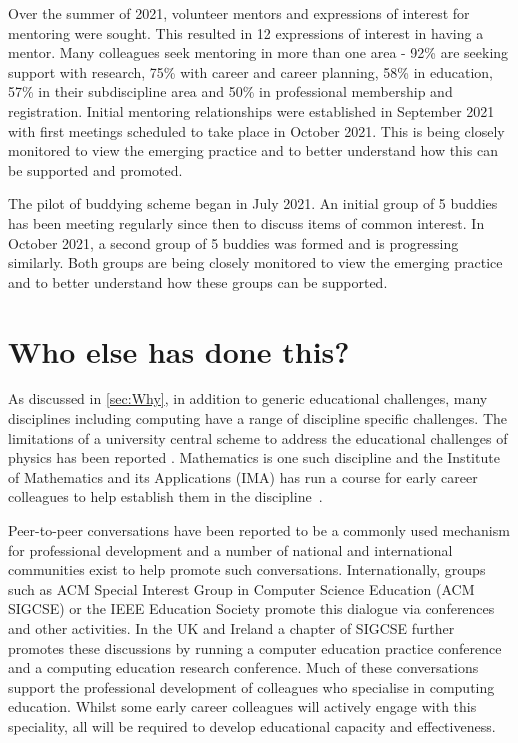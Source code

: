 \documentclass[sigconf]{acmart}
\begin{document}
Over the summer of 2021, volunteer mentors and expressions of interest for mentoring were sought. This resulted in 12 expressions of interest in having a mentor. Many colleagues seek mentoring in more than one area - 92\% are seeking support with research, 75\% with career and career planning, 58\% in education, 57\% in their subdiscipline area and 50\% in professional membership and registration. Initial mentoring relationships were established in September 2021 with first meetings scheduled to take place in October 2021. This is being closely monitored to view the emerging practice and to better understand how this can be supported and promoted.

\begin{comment}
To DO - evaluation of Buddying - PH what is needed here? Is sufficient to indicate the first pilot of 10 buddies has been established? Or do we need feedback from the participants?
\end{comment}

The pilot of buddying scheme began in July 2021. An initial group of 5
buddies has been meeting regularly since then to discuss items of
common interest. In October 2021, a second group of 5 buddies was
formed and is progressing similarly. Both groups are being closely
monitored to view the emerging practice and to better understand how
these groups can be supported.


\section{Who else has done this?}
As discussed in \ref{sec:Why}, in addition to generic educational
challenges, many disciplines including computing have a range of
discipline specific challenges. The limitations of a university
central scheme to address the educational challenges of physics has
been reported \cite{Magueijo2009}.  Mathematics is one such discipline
and the Institute of Mathematics and its Applications (IMA) has run a
course for early career colleagues to help establish them in the
discipline~\cite{IMA}.

Peer-to-peer conversations have been reported to be a commonly used
mechanism for professional development \cite{King2004} and a number of
national and international communities exist to help promote such
conversations. Internationally, groups such as ACM Special Interest
Group in Computer Science Education (ACM SIGCSE) or the IEEE Education
Society promote this dialogue via conferences and other activities.
In the UK and Ireland a chapter of SIGCSE further promotes these
discussions by running a computer education practice conference and a
computing education research conference. Much of these conversations
support the professional development of colleagues who specialise in
computing education. Whilst some early career colleagues will actively
engage with this speciality, all will be required to develop
educational capacity and effectiveness.
 
\end{document}
